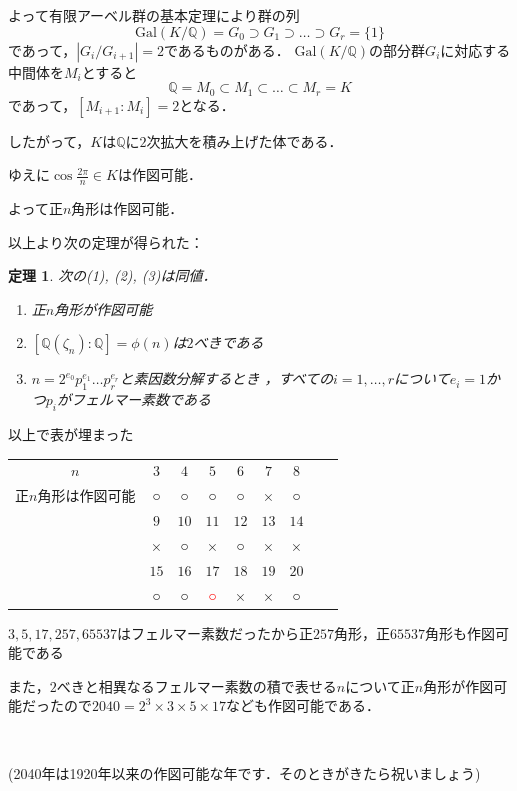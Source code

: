 \documentclass[dvipdfmx,17pt]{beamer}
\theoremstyle{plain}
\newtheorem{thm}{定理}
\newcommand{\Q}{\mathbb{Q}}
\begin{document}
\begin{frame}
よって有限アーベル群の基本定理により群の列
\[\mathrm{Gal}(K/\Q) = G_0 \supset G_1 \supset \dots \supset G_r = \{1\}\]
であって，$|G_i/G_{i+1}| = 2$であるものがある．
$\mathrm{Gal}(K/\Q)$の部分群$G_i$に対応する中間体を$M_i$とすると
\[\Q = M_0 \subset M_1 \subset \dots \subset M_r = K\]
であって，$[M_{i+1}:M_i] = 2$となる．
\end{frame}

\begin{frame}
したがって，$K$は$\Q$に$2$次拡大を積み上げた体である．

ゆえに$\cos \frac{2 \pi}{n} \in K$は作図可能．

よって正$n$角形は作図可能．
\end{frame}

\begin{frame}
以上より次の定理が得られた：
\begin{thm}
次の(1), (2), (3)は同値．
\begin{enumerate}
\item 正$n$角形が作図可能
\item $[\Q(\zeta_n) : \Q] = \phi(n)$は$2$べきである
\item $n = 2^{e_0} p_1^{e_1} \dots p_r^{e_r}$と素因数分解するとき
，すべての$i = 1, \dots, r$について$e_i = 1$かつ$p_i$がフェルマー素数である
\end{enumerate}
\end{thm}
\end{frame}

\begin{frame}
以上で表が埋まった
\small
\begin{table}[h]
  \begin{tabular}{ccccccccc}
    $n$ & $3$ & $4$ & $5$ & $6$ & $7$ & $8$ \\
    正$n$角形は作図可能 & ○ & ○ & ○ & ○ & × & ○ \\
     & $9$ & $10$ & $11$ & $12$ & $13$ & $14$ \\
     & × & ○ & × & ○ & × & × \\
     & $15$ & $16$ & $17$ & $18$ & $19$ & $20$ \\
     & ○ & ○ & \textcolor{red}{○} & × & × & ○
  \end{tabular}
\end{table}
\end{frame}

\begin{frame}
$3, 5, 17, 257, 65537$はフェルマー素数だったから正$257$角形，正$65537$角形も作図可能である

また，$2$べきと相異なるフェルマー素数の積で表せる$n$について正$n$角形が作図可能だったので$2040 = 2^3 \times 3 \times 5 \times 17$なども作図可能である．
\par　\par
\footnotesize 	(2040年は1920年以来の作図可能な年です．そのときがきたら祝いましょう)
\end{frame}
\end{document}

